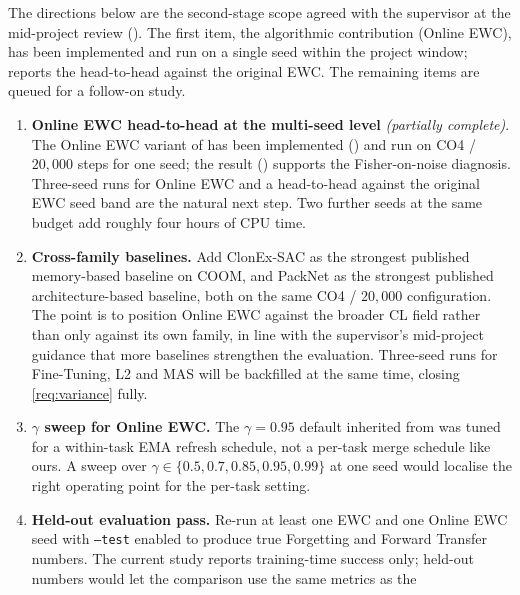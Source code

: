 The directions below are the second-stage scope agreed with
the supervisor at the mid-project review
(). The first item, the algorithmic
contribution (Online EWC), has been implemented and run on a
single seed within the project window; 
reports the head-to-head against the original EWC. The
remaining items are queued for a follow-on study.

\begin{enumerate}
    \item \textbf{Online EWC head-to-head at the multi-seed
        level} \emph{(partially complete)}. The Online EWC
        variant of \citet{schwarz2018progress} has been
        implemented () and run on
        CO4 / $20{,}000$ steps for one seed; the result
        () supports the Fisher-on-noise
        diagnosis. Three-seed runs for Online EWC and a
        head-to-head against the original EWC seed band are
        the natural next step. Two further seeds at the same
        budget add roughly four hours of CPU time.
    \item \textbf{Cross-family baselines.} Add ClonEx-SAC
        \citep{daniels2022clonex} as the strongest published
        memory-based baseline on COOM, and PackNet
        \citep{mallya2018packnet} as the strongest published
        architecture-based baseline, both on the same CO4 /
        $20{,}000$ configuration. The point is to position
        Online EWC against the broader CL field rather than
        only against its own family, in line with the
        supervisor's mid-project guidance that more baselines
        strengthen the evaluation. Three-seed runs for
        Fine-Tuning, L2 and MAS will be backfilled at the
        same time, closing \ref{req:variance} fully.
    \item \textbf{$\gamma$ sweep for Online EWC.} The
        $\gamma = 0.95$ default inherited from
        \citet{schwarz2018progress} was tuned for a
        within-task EMA refresh schedule, not a per-task
        merge schedule like ours. A sweep over
        $\gamma \in \{0.5, 0.7, 0.85, 0.95, 0.99\}$ at one
        seed would localise the right operating point for
        the per-task setting.
    \item \textbf{Held-out evaluation pass.} Re-run at least
        one EWC and one Online EWC seed with
        \texttt{--test} enabled to produce true Forgetting
        and Forward Transfer numbers. The current study
        reports training-time success only; held-out numbers
        would let the comparison use the same metrics as the

\end{enumerate}

